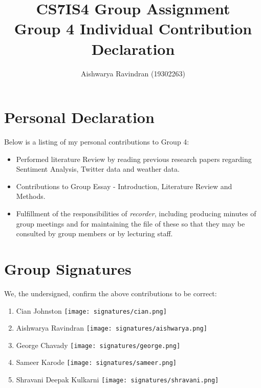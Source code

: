\documentclass[a4paper,10pt]{article}
\begin{document}
\title{
    CS7IS4 Group Assignment \\
    \large Group 4 Individual Contribution Declaration
}
\author{
    Aishwarya Ravindran (19302263)
}

\maketitle

\section{Personal Declaration}

Below is a listing of my personal contributions to Group 4:

\begin{itemize}
    \item{
        Performed literature Review by reading previous research papers regarding Sentiment Analysis, Twitter data and weather data.
    }
    
    \item{
        Contributions to Group Essay - Introduction, Literature Review and Methods.
    }
    \item{
        Fulfillment of the responsibilities of \textit{recorder}, including producing minutes of group meetings and for maintaining the file of these so that they may be consulted by group members or by lecturing staff. 
    }
\end{itemize}

\section{Group Signatures}

We, the undersigned, confirm the above contributions to be correct:

\begin{enumerate}
    \item{
        Cian Johnston \texttt{[image: signatures/cian.png]}
    }
    \item{
        Aishwarya Ravindran \texttt{[image: signatures/aishwarya.png]}
    }
    \item{
        George Chavady \texttt{[image: signatures/george.png]}
    }
    \item{
        Sameer Karode \texttt{[image: signatures/sameer.png]}
    }
    \item{
        Shravani Deepak Kulkarni \texttt{[image: signatures/shravani.png]}
    }

\end{enumerate}
\end{document}
